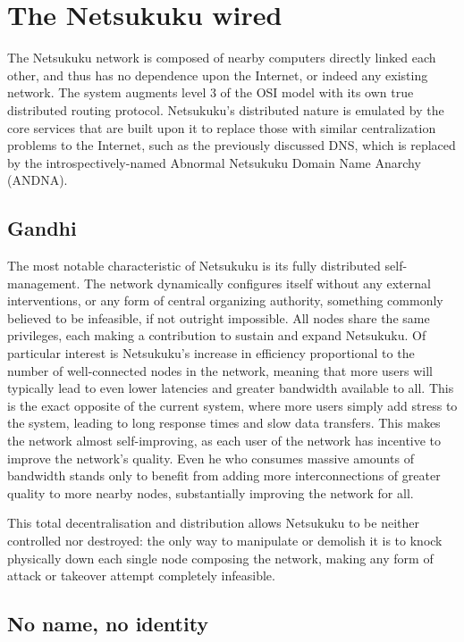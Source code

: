 \documentclass[a4paper]{article}
\begin{document}
\section{The Netsukuku wired}

The Netsukuku network is composed of nearby computers directly linked each other, 
and thus has no dependence upon the Internet, or indeed any existing network.
The system augments level 3 of the OSI model with its own true distributed routing protocol.
Netsukuku's distributed nature is emulated by the core services that are built upon 
it to replace those with similar centralization problems to the Internet, such as
the previously discussed DNS, which is replaced by the introspectively-named 
Abnormal Netsukuku Domain Name Anarchy (ANDNA)\cite{andnadoc}.

\subsection{Gandhi}

The most notable characteristic of Netsukuku is its fully distributed self-management.
The network dynamically configures itself without any external interventions, or any 
form of central organizing authority, something commonly believed to be infeasible,
if not outright impossible.  
All nodes share the same privileges, each making a contribution to sustain and expand
Netsukuku.
Of particular interest is Netsukuku's increase in efficiency proportional to the 
number of well-connected nodes in the network, meaning that more users will typically
lead to even lower latencies and greater bandwidth available to all.
This is the exact opposite of the current system, where more users simply add stress 
to the system, leading to long response times and slow data transfers.  
This makes the network almost self-improving, as each user of the network has incentive
to improve the network's quality.  Even he who consumes massive amounts of bandwidth
stands only to benefit from adding more interconnections of greater quality to more
nearby nodes, substantially improving the network for all.

This total decentralisation and distribution allows Netsukuku to be neither controlled
nor destroyed: the only way to manipulate or demolish it is to knock physically down 
each single node composing the network, making any form of attack or takeover attempt
completely infeasible.

\subsection{No name, no identity}
\end{document}
